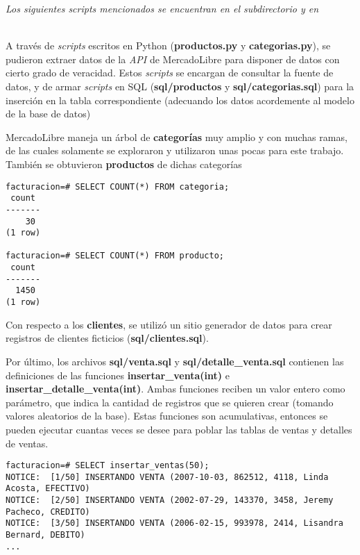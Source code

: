 \emph{Los siguientes \emph{scripts} mencionados se encuentran en el subdirectorio  y en } 

~\\

A través de \emph{scripts} escritos en Python (\textbf{productos.py} y \textbf{categorias.py}), se pudieron extraer datos de la \emph{API} de MercadoLibre \autocite{api} para disponer de datos con cierto grado de veracidad. Estos \emph{scripts} se encargan de consultar la fuente de datos, y de armar \emph{scripts} en SQL (\textbf{sql/productos} y \textbf{sql/categorias.sql}) para la inserción en la tabla correspondiente (adecuando los datos acordemente al modelo de la base de datos)  

MercadoLibre maneja un árbol de \textbf{categorías} muy amplio y con muchas ramas, de las cuales solamente se exploraron y utilizaron unas pocas para este trabajo. También se obtuvieron \textbf{productos} de dichas categorías

\pagebreak

\vspace*{5mm}
\begin{lstlisting}[title=Cantidad de categorías y productos disponibles en el sistema de facturación viejo]
facturacion=# SELECT COUNT(*) FROM categoria;
 count 
-------
    30
(1 row)

facturacion=# SELECT COUNT(*) FROM producto;
 count 
-------
  1450
(1 row)
\end{lstlisting}

Con respecto a los \textbf{clientes}, se utilizó un sitio generador de datos \autocite{data} para crear registros de clientes ficticios (\textbf{sql/clientes.sql}). 

Por último, los archivos \textbf{sql/venta.sql} y \textbf{sql/detalle\_venta.sql} contienen las definiciones de las funciones \textbf{insertar\_venta(int)} e \textbf{insertar\_detalle\_venta(int)}. Ambas funciones reciben un valor entero como parámetro, que indica la cantidad de registros que se quieren crear (tomando valores aleatorios de la base). Estas funciones son acumulativas, entonces se pueden ejecutar cuantas veces se desee para poblar las tablas de ventas y detalles de ventas.

\vspace*{5mm}
\begin{lstlisting}[title=Inserción de 50 ventas aleatorias en la BD]
facturacion=# SELECT insertar_ventas(50);
NOTICE:  [1/50] INSERTANDO VENTA (2007-10-03, 862512, 4118, Linda Acosta, EFECTIVO)
NOTICE:  [2/50] INSERTANDO VENTA (2002-07-29, 143370, 3458, Jeremy Pacheco, CREDITO)
NOTICE:  [3/50] INSERTANDO VENTA (2006-02-15, 993978, 2414, Lisandra Bernard, DEBITO)
...
\end{lstlisting}

